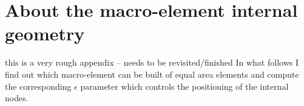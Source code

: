 \documentclass[a4paper,12pt]{article}
\begin{document}


\section{About the macro-element internal geometry}

{\color{red} this is a very rough appendix -- needs to be revisited/finished}
In what follows I find out which macro-element 
can be built of equal area elements and compute 
the corresponding $\epsilon$ parameter which controls the positioning of the internal nodes.


\end{document}
